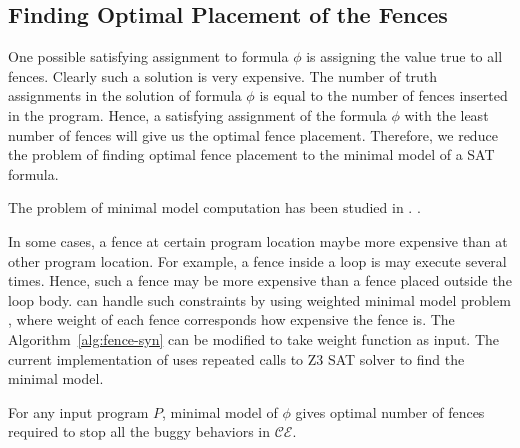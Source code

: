 \subsection{Finding Optimal Placement of the Fences}
One possible satisfying assignment to formula $ \phi $ is assigning the 
value true to all fences. Clearly such a solution is very expensive.
The number of truth assignments in the solution of formula $ \phi $ is 
equal to the number of fences inserted in the program.
Hence, a satisfying assignment of the formula $ \phi $ with the least 
number of fences will give us the optimal fence placement. 
Therefore, we reduce the problem of finding optimal fence placement to the 
minimal model of a SAT formula. 

The problem of minimal model computation has been studied in 
. .

In some cases, a fence at certain program location maybe more expensive 
than at other program location. For example, a fence inside a loop is may 
execute several times. Hence, such a fence may be more expensive than a 
fence placed outside the loop body.
%
\ourtechnique can handle such constraints by using weighted minimal model 
problem , where weight of each fence 
corresponds how expensive the fence is. 
The Algorithm~\ref{alg:fence-syn} can be modified to take weight 
function as input. 
%
The current implementation of \ourtechnique uses repeated calls to Z3 SAT 
solver to find the minimal model. 


\begin{theorem}
	For any input program $ P $, minimal model of $ \phi $ gives optimal
	number of fences required to stop all the buggy behaviors in 
	$ \mathcal{CE} $.
\end{theorem}

